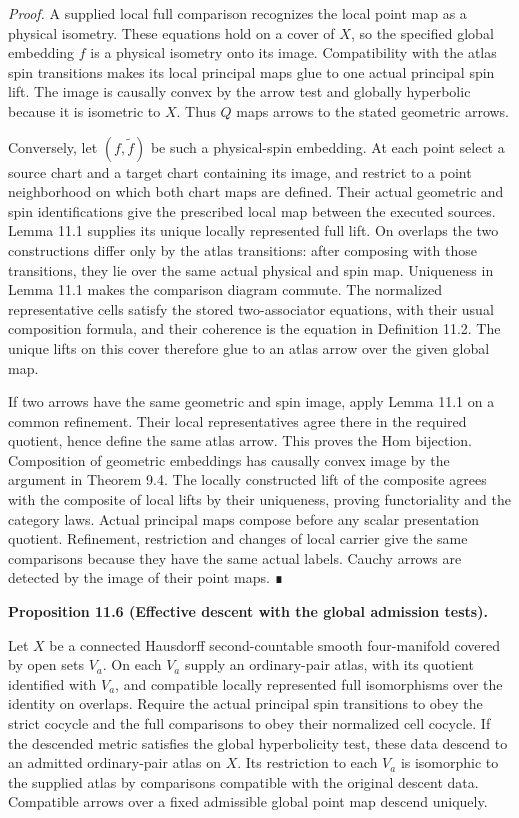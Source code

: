 \documentclass[
  english,
  11pt,
  reqno]{amsart}
\makeatletter
\newcommand{\pandocstatementheading}[1]{%
  \par\addpenalty{\@beginparpenalty}%
  \addvspace{.5\baselineskip plus .2\baselineskip minus .2\baselineskip}%
  {\normalfont\bfseries #1\par}%
  \nobreak\@afterindenttrue\@afterheading
}
\makeatother
\begin{document}
\emph{Proof.} A supplied local full comparison recognizes the local
point map as a physical isometry. These equations hold on a cover of
\(X\), so the specified global embedding \(f\) is a physical isometry
onto its image. Compatibility with the atlas spin transitions makes its
local principal maps glue to one actual principal spin lift. The image
is causally convex by the arrow test and globally hyperbolic because it
is isometric to \(X\). Thus \(Q\) maps arrows to the stated geometric
arrows.

Conversely, let \((f,\widetilde f)\) be such a physical-spin embedding.
At each point select a source chart and a target chart containing its
image, and restrict to a point neighborhood on which both chart maps are
defined. Their actual geometric and spin identifications give the
prescribed local map between the executed sources. Lemma 11.1 supplies
its unique locally represented full lift. On overlaps the two
constructions differ only by the atlas transitions: after composing with
those transitions, they lie over the same actual physical and spin map.
Uniqueness in Lemma 11.1 makes the comparison diagram commute. The
normalized representative cells satisfy the stored two-associator
equations, with their usual composition formula, and their coherence is
the equation in Definition 11.2. The unique lifts on this cover
therefore glue to an atlas arrow over the given global map.

If two arrows have the same geometric and spin image, apply Lemma 11.1
on a common refinement. Their local representatives agree there in the
required quotient, hence define the same atlas arrow. This proves the
Hom bijection. Composition of geometric embeddings has causally convex
image by the argument in Theorem 9.4. The locally constructed lift of
the composite agrees with the composite of local lifts by their
uniqueness, proving functoriality and the category laws. Actual
principal maps compose before any scalar presentation quotient.
Refinement, restriction and changes of local carrier give the same
comparisons because they have the same actual labels. Cauchy arrows are
detected by the image of their point maps. ∎

\pandocstatementheading{\protect{}\label{prop:ordinary-atlas-effective-descent}Proposition 11.6 (Effective descent with the global admission tests).}

Let \(X\) be a connected Hausdorff second-countable smooth four-manifold
covered by open sets \(V_a\). On each \(V_a\) supply an ordinary-pair
atlas, with its quotient identified with \(V_a\), and compatible locally
represented full isomorphisms over the identity on overlaps. Require the
actual principal spin transitions to obey the strict cocycle and the
full comparisons to obey their normalized cell cocycle. If the descended
metric satisfies the global hyperbolicity test, these data descend to an
admitted ordinary-pair atlas on \(X\). Its restriction to each \(V_a\)
is isomorphic to the supplied atlas by comparisons compatible with the
original descent data. Compatible arrows over a fixed admissible global
point map descend uniquely.
\end{document}
